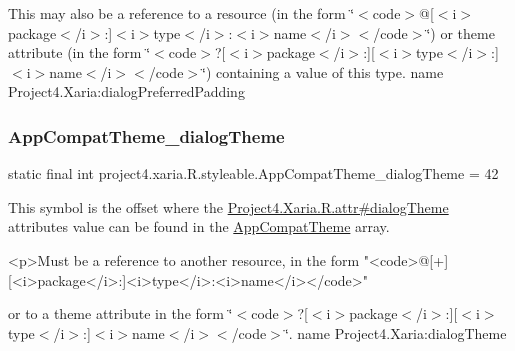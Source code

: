 This may also be a reference to a resource (in the form \char`\"{}$<$code$>$@\mbox{[}$<$i$>$package$<$/i$>$\+:\mbox{]}$<$i$>$type$<$/i$>$\+:$<$i$>$name$<$/i$>$$<$/code$>$\char`\"{}) or theme attribute (in the form \char`\"{}$<$code$>$?\mbox{[}$<$i$>$package$<$/i$>$\+:\mbox{]}\mbox{[}$<$i$>$type$<$/i$>$\+:\mbox{]}$<$i$>$name$<$/i$>$$<$/code$>$\char`\"{}) containing a value of this type.  name Project4.\+Xaria\+:dialog\+Preferred\+Padding \mbox{\label{classproject4_1_1xaria_1_1R_1_1styleable_a5519afdb0c80e54310abbe3db266a072}} 
\subsubsection{\texorpdfstring{App\+Compat\+Theme\+\_\+dialog\+Theme}{AppCompatTheme\_dialogTheme}}
{\footnotesize\ttfamily static final int project4.\+xaria.\+R.\+styleable.\+App\+Compat\+Theme\+\_\+dialog\+Theme = 42\hspace{0.3cm}{\ttfamily [static]}}

This symbol is the offset where the \hyperlink{}{Project4.\+Xaria.\+R.\+attr\#dialog\+Theme} attribute\textquotesingle{}s value can be found in the \hyperlink{classproject4_1_1xaria_1_1R_1_1styleable_aad8bec413e2350f9404e6ff0e831a85d}{App\+Compat\+Theme} array.

\begin{DoxyVerb}      <p>Must be a reference to another resource, in the form "<code>@[+][<i>package</i>:]<i>type</i>:<i>name</i></code>"
\end{DoxyVerb}
 or to a theme attribute in the form \char`\"{}$<$code$>$?\mbox{[}$<$i$>$package$<$/i$>$\+:\mbox{]}\mbox{[}$<$i$>$type$<$/i$>$\+:\mbox{]}$<$i$>$name$<$/i$>$$<$/code$>$\char`\"{}.  name Project4.\+Xaria\+:dialog\+Theme \mbox{\label{classproject4_1_1xaria_1_1R_1_1styleable_ade51be41034a192ff35bec03ba87a1aa}} 
